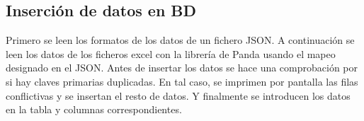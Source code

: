     \subsection{Inserción de datos en BD}
      Primero se leen los formatos de los datos de un fichero JSON.
      A continuación se leen los datos de los ficheros excel con la librería de Panda usando el mapeo designado en el JSON.
      Antes de insertar los datos se hace una comprobación por si hay claves primarias duplicadas. En tal caso, se imprimen por pantalla las filas conflictivas y se insertan el resto de datos. 
      Y finalmente se introducen los datos en la tabla y columnas correspondientes.
